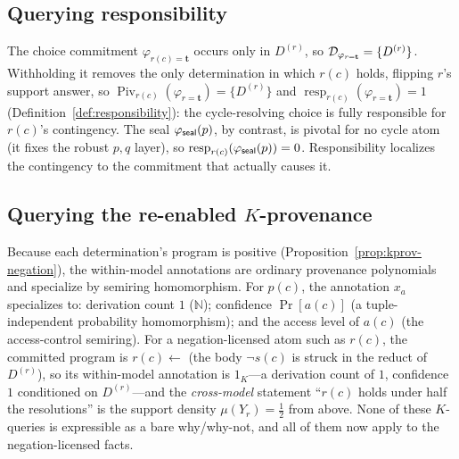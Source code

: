 \subsection{Querying responsibility}

The choice commitment $\varphi_{r(c)=\mathbf{t}}$ occurs only in $D^{(r)}$, so
$\mathcal{D}_{\varphi_{r=\mathbf{t}}} = \{D^{(r)}\}$. Withholding it removes the only
determination in which $r(c)$ holds, flipping $r$'s support answer, so
$\operatorname{Piv}_{r(c)}(\varphi_{r=\mathbf{t}}) = \{D^{(r)}\}$ and
$\operatorname{resp}_{r(c)}(\varphi_{r=\mathbf{t}}) = 1$
(Definition~\ref{def:responsibility}): the cycle-resolving choice is fully
responsible for $r(c)$'s contingency. The seal $\varphi_{\mathsf{seal}}(p)$, by
contrast, is pivotal for no cycle atom (it fixes the robust $p,q$ layer), so
$\operatorname{resp}_{r(c)}(\varphi_{\mathsf{seal}}(p)) = 0$. Responsibility localizes
the contingency to the commitment that actually causes it.

\subsection{Querying the re-enabled $K$-provenance}

Because each determination's program is positive
(Proposition~\ref{prop:kprov-negation}), the within-model annotations are
ordinary provenance polynomials and specialize by semiring homomorphism. For
$p(c)$, the annotation $x_a$ specializes to: derivation count $1$
($\mathbb{N}$); confidence $\Pr[a(c)]$ (a tuple-independent probability
homomorphism); and the access level of $a(c)$ (the access-control semiring).
For a negation-licensed atom such as $r(c)$, the committed program is $r(c)
\leftarrow{}$ (the body $\neg s(c)$ is struck in the reduct of $D^{(r)}$), so
its within-model annotation is $1_K$---a derivation count of $1$, confidence
$1$ conditioned on $D^{(r)}$---and the \emph{cross-model} statement ``$r(c)$
holds under half the resolutions'' is the support density $\mu(Y_r) = \tfrac12$
from above. None of these $K$-queries is expressible as a bare why/why-not, and
all of them now apply to the negation-licensed facts.
